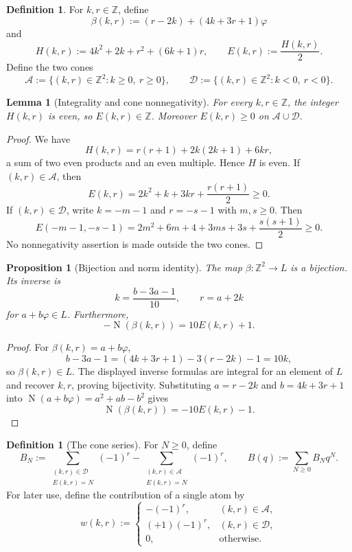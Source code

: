 \documentclass[12pt]{amsart}
\newtheorem{proposition}[theorem]{Proposition}
\newtheorem{lemma}[theorem]{Lemma}
\theoremstyle{definition}
\newtheorem{definition}[theorem]{Definition}
\theoremstyle{remark}
\DeclareMathOperator{\N}{N}
\newcommand{\ZZ}{\mathbb{Z}}
\newcommand{\ph}{\varphi}
\newcommand{\Acone}{\mathcal{A}}
\newcommand{\Dcone}{\mathcal{D}}
\begin{document}
\begin{definition}\label{def:beta-E}
For $k,r\in\ZZ$, define
\[
  \beta(k,r):=(r-2k)+(4k+3r+1)\ph
\]
and
\[
  H(k,r):=4k^2+2k+r^2+(6k+1)r,
  \qquad
  E(k,r):=\frac{H(k,r)}2.
\]
Define the two cones
\[
  \Acone:=\{(k,r)\in\ZZ^2:k\geq0,\ r\geq0\},
  \qquad
  \Dcone:=\{(k,r)\in\ZZ^2:k<0,\ r<0\}.
\]
\end{definition}

\begin{lemma}[Integrality and cone nonnegativity]\label{lem:E}
For every $k,r\in\ZZ$, the integer $H(k,r)$ is even, so
$E(k,r)\in\ZZ$.  Moreover $E(k,r)\geq0$ on
$\Acone\cup\Dcone$.
\end{lemma}

\begin{proof}
We have
\[
  H(k,r)=r(r+1)+2k(2k+1)+6kr,
\]
a sum of two even products and an even multiple.  Hence $H$ is even.
If $(k,r)\in\Acone$, then
\[
  E(k,r)=2k^2+k+3kr+\frac{r(r+1)}2\geq0.
\]
If $(k,r)\in\Dcone$, write $k=-m-1$ and $r=-s-1$ with
$m,s\geq0$.  Then
\[
  E(-m-1,-s-1)
  =2m^2+6m+4+3ms+3s+\frac{s(s+1)}2\geq0.
\]
No nonnegativity assertion is made outside the two cones.
\end{proof}

\begin{proposition}[Bijection and norm identity]\label{prop:beta-norm}
The map $\beta:\ZZ^2\to L$ is a bijection.  Its inverse is
\[
  k=\frac{b-3a-1}{10},
  \qquad
  r=a+2k
\]
for $a+b\ph\in L$.  Furthermore,
\[
  -\N(\beta(k,r))=10E(k,r)+1.
\]
\end{proposition}

\begin{proof}
For $\beta(k,r)=a+b\ph$,
\[
  b-3a-1
  =(4k+3r+1)-3(r-2k)-1=10k,
\]
so $\beta(k,r)\in L$.  The displayed inverse formulas are integral for
an element of $L$ and recover $k,r$, proving bijectivity.  Substituting
$a=r-2k$ and $b=4k+3r+1$ into
$\N(a+b\ph)=a^2+ab-b^2$ gives
\[
  \N(\beta(k,r))=-10E(k,r)-1.
\]
\end{proof}

\begin{definition}[The cone series]\label{def:B}
For $N\geq0$, define
\[
  B_N:=
  \sum_{\substack{(k,r)\in\Dcone\\E(k,r)=N}}(-1)^r
  -
  \sum_{\substack{(k,r)\in\Acone\\E(k,r)=N}}(-1)^r,
  \qquad
  B(q):=\sum_{N\geq0}B_Nq^N.
\]
For later use, define the contribution of a single atom by
\[
  w(k,r):=
  \begin{cases}
    -(-1)^r,&(k,r)\in\Acone,\\
    (+1)(-1)^r,&(k,r)\in\Dcone,\\
    0,&\text{otherwise}.
  \end{cases}
\]
\end{definition}
\end{document}
